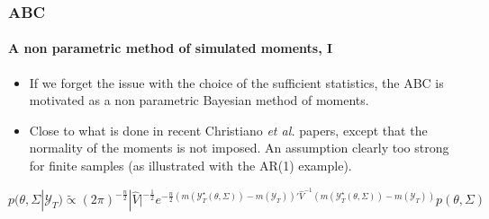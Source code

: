 \documentclass[10pt]{beamer}
\begin{document}
\begin{frame}
  \frametitle{ABC}
  \framesubtitle{A non parametric method of simulated  moments, I}

  \bigskip
  
  \begin{itemize}
    
  \item If we forget the issue with the choice of the sufficient
    statistics, the ABC is motivated as a non parametric Bayesian
    method of moments.\newline

    \bigskip

  \item Close to what is done in recent Christiano \textit{et al.}
    papers, except that the normality of the moments is not
    imposed. An assumption clearly too strong for finite samples (as
    illustrated with the AR(1) example).\newline

  \end{itemize}

  \bigskip
  
  \[
    p(\theta,\Sigma|\mathcal Y_T) \widetilde{\propto}
    (2\pi)^{-\frac{n}{2}}|\widehat V|^{-\frac{1}{2}}e^{-\frac{n}{2}\left(m\left(\mathcal Y_T^{\star}(\theta,\Sigma)\right)-m\left(\mathcal Y_T\right)\right)'\widehat V^{-1}\left(m\left(\mathcal Y_T^{\star}(\theta,\Sigma)\right)-m\left(\mathcal Y_T\right)\right)}p(\theta,\Sigma)
  \]


\end{frame}
\end{document}
